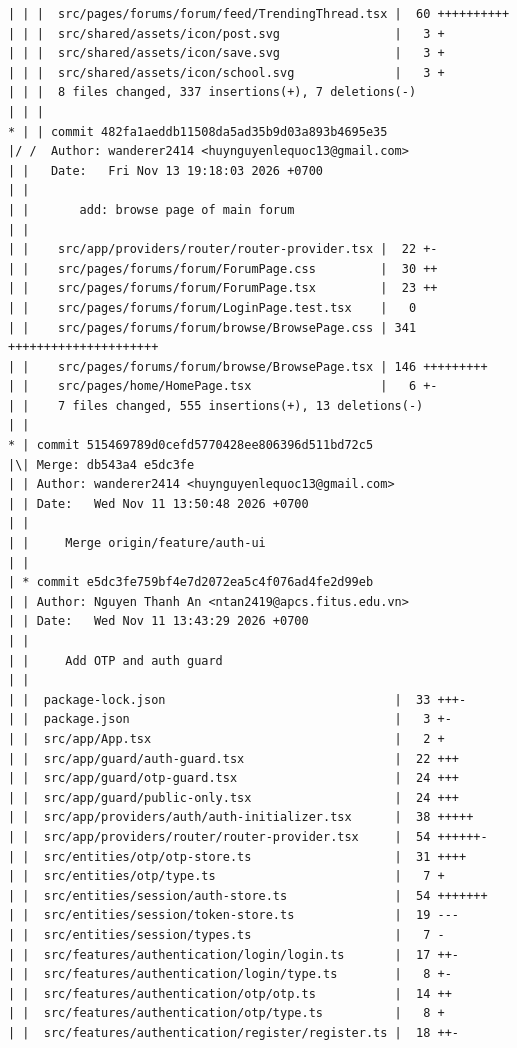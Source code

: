 \documentclass[12pt]{article}
\begin{document}
\begin{lstlisting}[numbers=none,breaklines=true]
| | |  src/pages/forums/forum/feed/TrendingThread.tsx |  60 ++++++++++
| | |  src/shared/assets/icon/post.svg                |   3 +
| | |  src/shared/assets/icon/save.svg                |   3 +
| | |  src/shared/assets/icon/school.svg              |   3 +
| | |  8 files changed, 337 insertions(+), 7 deletions(-)
| | |
* | | commit 482fa1aeddb11508da5ad35b9d03a893b4695e35
|/ /  Author: wanderer2414 <huynguyenlequoc13@gmail.com>
| |   Date:   Fri Nov 13 19:18:03 2026 +0700
| |
| |       add: browse page of main forum
| |
| |    src/app/providers/router/router-provider.tsx |  22 +-
| |    src/pages/forums/forum/ForumPage.css         |  30 ++
| |    src/pages/forums/forum/ForumPage.tsx         |  23 ++
| |    src/pages/forums/forum/LoginPage.test.tsx    |   0
| |    src/pages/forums/forum/browse/BrowsePage.css | 341 +++++++++++++++++++++
| |    src/pages/forums/forum/browse/BrowsePage.tsx | 146 +++++++++
| |    src/pages/home/HomePage.tsx                  |   6 +-
| |    7 files changed, 555 insertions(+), 13 deletions(-)
| |
* | commit 515469789d0cefd5770428ee806396d511bd72c5
|\| Merge: db543a4 e5dc3fe
| | Author: wanderer2414 <huynguyenlequoc13@gmail.com>
| | Date:   Wed Nov 11 13:50:48 2026 +0700
| |
| |     Merge origin/feature/auth-ui
| |
| * commit e5dc3fe759bf4e7d2072ea5c4f076ad4fe2d99eb
| | Author: Nguyen Thanh An <ntan2419@apcs.fitus.edu.vn>
| | Date:   Wed Nov 11 13:43:29 2026 +0700
| |
| |     Add OTP and auth guard
| |
| |  package-lock.json                                |  33 +++-
| |  package.json                                     |   3 +-
| |  src/app/App.tsx                                  |   2 +
| |  src/app/guard/auth-guard.tsx                     |  22 +++
| |  src/app/guard/otp-guard.tsx                      |  24 +++
| |  src/app/guard/public-only.tsx                    |  24 +++
| |  src/app/providers/auth/auth-initializer.tsx      |  38 +++++
| |  src/app/providers/router/router-provider.tsx     |  54 ++++++-
| |  src/entities/otp/otp-store.ts                    |  31 ++++
| |  src/entities/otp/type.ts                         |   7 +
| |  src/entities/session/auth-store.ts               |  54 +++++++
| |  src/entities/session/token-store.ts              |  19 ---
| |  src/entities/session/types.ts                    |   7 -
| |  src/features/authentication/login/login.ts       |  17 ++-
| |  src/features/authentication/login/type.ts        |   8 +-
| |  src/features/authentication/otp/otp.ts           |  14 ++
| |  src/features/authentication/otp/type.ts          |   8 +
| |  src/features/authentication/register/register.ts |  18 ++-

\end{lstlisting}
\end{document}

